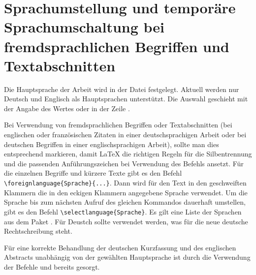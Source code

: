 \section{Sprachumstellung und temporäre Sprachumschaltung bei fremdsprachlichen Begriffen und Textabschnitten}%
%
%
%
%
\label{sec:Sprache}
%
Die Hauptsprache der Arbeit wird in der Datei  festgelegt.
Aktuell werden nur Deutsch und Englisch als Hauptsprachen unterstützt.
Die Auswahl geschieht mit der Angabe des Wertes  oder 
in der Zeile .

Bei Verwendung von fremdsprachlichen Begriffen oder Textabschnitten
(\zB bei englischen oder französischen Zitaten in einer deutschsprachigen Arbeit
oder bei deutschen Begriffen in einer englischsprachigen Arbeit),
sollte man dies entsprechend markieren,
damit \LaTeX{} die richtigen Regeln für die Silbentrennung
und die passenden Anführungszeichen bei Verwendung des Befehls
 ansetzt.
Für die einzelnen Begriffe und kürzere Texte gibt es den Befehl
\verb+\foreignlanguage{Sprache}{...}+.
Dann wird für den Text in den geschweiften Klammern die in den eckigen Klammern angegebene Sprache verwendet.
Um die Sprache bis zum nächsten Aufruf des gleichen Kommandos dauerhaft umstellen,
gibt es den Befehl \verb+\selectlanguage{Sprache}+.
Es gilt eine Liste der Sprachen aus dem Paket .
Für Deustch sollte  verwendet werden, was für die
neue deutsche Rechtschreibung steht.

Für eine korrekte Behandlung der deutschen Kurzfassung und des englischen Abstracts
unabhängig von der gewählten Hauptsprache ist durch die Verwendung der Befehle
 und  bereits gesorgt.